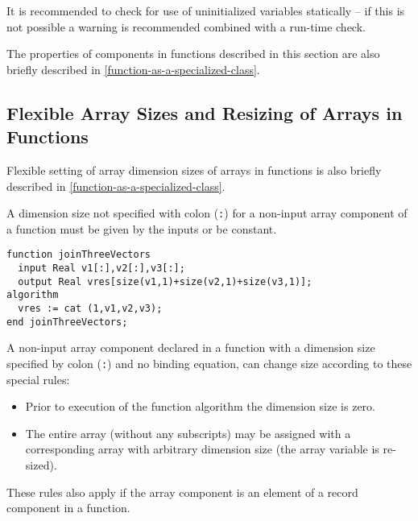 \begin{nonnormative}
It is recommended to check for use of uninitialized variables statically -- if this is not possible a warning is recommended
combined with a run-time check.
\end{nonnormative}

\begin{nonnormative}
The properties of components in functions described in this
section are also briefly described in \cref{function-as-a-specialized-class}.
\end{nonnormative}

\subsection{Flexible Array Sizes and Resizing of Arrays in Functions}\label{flexible-array-sizes-and-resizing-of-arrays-in-functions}

\begin{nonnormative}
Flexible setting of array dimension sizes of arrays in
functions is also briefly described in \cref{function-as-a-specialized-class}.
\end{nonnormative}

A dimension size not specified with colon (\lstinline!:!) for a non-input array component of a function must be given by the inputs or be constant.

\begin{example}
\begin{lstlisting}[language=modelica]
function joinThreeVectors
  input Real v1[:],v2[:],v3[:];
  output Real vres[size(v1,1)+size(v2,1)+size(v3,1)];
algorithm
  vres := cat (1,v1,v2,v3);
end joinThreeVectors;
\end{lstlisting}
\end{example}

A non-input array component declared in a function with a dimension size specified by colon (\lstinline!:!) and no binding equation, can change size according to these special rules:
\begin{itemize}
\item
  Prior to execution of the function algorithm the dimension size is zero.
\item
  The entire array (without any subscripts) may be assigned with a corresponding array with arbitrary dimension size (the array variable is re-sized).
\end{itemize}

These rules also apply if the array component is an element of a record
component in a function.

